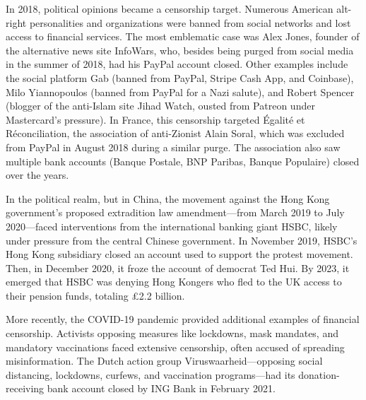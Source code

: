 \documentclass[
  a5paper,
  smalldemyvopaper,10pt,twoside,onecolumn,openright,extrafontsizes,hidelinks]{memoir}
\begin{document}
In 2018, political opinions became a censorship target. Numerous
American alt-right personalities and organizations were banned from
social networks and lost access to financial services. The most
emblematic case was Alex Jones, founder of the alternative news site
InfoWars, who, besides being purged from social media in the summer of
2018, had his PayPal account closed. Other examples include the social
platform Gab (banned from PayPal, Stripe Cash App, and Coinbase), Milo
Yiannopoulos (banned from PayPal for a Nazi salute), and Robert Spencer
(blogger of the anti-Islam site Jihad Watch, ousted from Patreon under
Mastercard's pressure). In France, this censorship targeted Égalité et
Réconciliation, the association of anti-Zionist Alain Soral, which was
excluded from PayPal in August 2018 during a similar purge. The
association also saw multiple bank accounts (Banque Postale, BNP
Paribas, Banque Populaire) closed over the years.

In the political realm, but in China, the movement against the Hong Kong
government's proposed extradition law amendment---from March 2019 to
July 2020---faced interventions from the international banking giant
HSBC, likely under pressure from the central Chinese government. In
November 2019, HSBC's Hong Kong subsidiary closed an account used to
support the protest movement. Then, in December 2020, it froze the
account of democrat Ted Hui. By 2023, it emerged that HSBC was denying
Hong Kongers who fled to the UK access to their pension funds, totaling
£2.2 billion.

More recently, the COVID-19 pandemic provided additional examples of
financial censorship. Activists opposing measures like lockdowns, mask
mandates, and mandatory vaccinations faced extensive censorship, often
accused of spreading misinformation. The Dutch action group
Viruswaarheid---opposing social distancing, lockdowns, curfews, and
vaccination programs---had its donation-receiving bank account closed by
ING Bank in February 2021.
\end{document}
